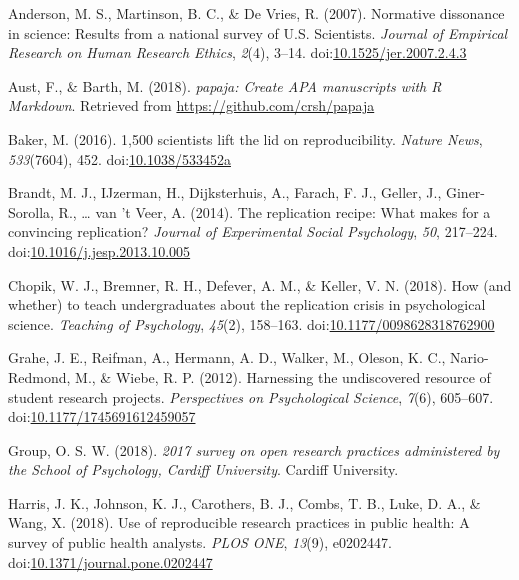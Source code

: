 \documentclass[
  man,mask,floatsintext]{apa6}
\newlength{\cslhangindent}
\newenvironment{cslreferences}%
  {\setlength{\parindent}{0pt}%
  \everypar{\setlength{\hangindent}{\cslhangindent}}\ignorespaces}%
  {\par}
\begin{document}
\hypertarget{refs}{}
\begin{cslreferences}
\leavevmode\hypertarget{ref-andersonNormativeDissonanceScience2007}{}%
Anderson, M. S., Martinson, B. C., \& De Vries, R. (2007). Normative dissonance in science: Results from a national survey of U.S. Scientists. \emph{Journal of Empirical Research on Human Research Ethics}, \emph{2}(4), 3--14. doi:\href{https://doi.org/10.1525/jer.2007.2.4.3}{10.1525/jer.2007.2.4.3}

\leavevmode\hypertarget{ref-R-papaja}{}%
Aust, F., \& Barth, M. (2018). \emph{papaja: Create APA manuscripts with R Markdown}. Retrieved from \url{https://github.com/crsh/papaja}

\leavevmode\hypertarget{ref-baker500ScientistsLift2016}{}%
Baker, M. (2016). 1,500 scientists lift the lid on reproducibility. \emph{Nature News}, \emph{533}(7604), 452. doi:\href{https://doi.org/10.1038/533452a}{10.1038/533452a}

\leavevmode\hypertarget{ref-brandtReplicationRecipeWhat2014}{}%
Brandt, M. J., IJzerman, H., Dijksterhuis, A., Farach, F. J., Geller, J., Giner-Sorolla, R., \ldots{} van 't Veer, A. (2014). The replication recipe: What makes for a convincing replication? \emph{Journal of Experimental Social Psychology}, \emph{50}, 217--224. doi:\href{https://doi.org/10.1016/j.jesp.2013.10.005}{10.1016/j.jesp.2013.10.005}

\leavevmode\hypertarget{ref-chopikHowWhetherTeach2018}{}%
Chopik, W. J., Bremner, R. H., Defever, A. M., \& Keller, V. N. (2018). How (and whether) to teach undergraduates about the replication crisis in psychological science. \emph{Teaching of Psychology}, \emph{45}(2), 158--163. doi:\href{https://doi.org/10.1177/0098628318762900}{10.1177/0098628318762900}

\leavevmode\hypertarget{ref-graheHarnessingUndiscoveredResource2012}{}%
Grahe, J. E., Reifman, A., Hermann, A. D., Walker, M., Oleson, K. C., Nario-Redmond, M., \& Wiebe, R. P. (2012). Harnessing the undiscovered resource of student research projects. \emph{Perspectives on Psychological Science}, \emph{7}(6), 605--607. doi:\href{https://doi.org/10.1177/1745691612459057}{10.1177/1745691612459057}

\leavevmode\hypertarget{ref-openscienceworkinggroup2017SurveyOpen2018}{}%
Group, O. S. W. (2018). \emph{2017 survey on open research practices administered by the School of Psychology, Cardiff University}. Cardiff University.

\leavevmode\hypertarget{ref-harrisUseReproducibleResearch2018}{}%
Harris, J. K., Johnson, K. J., Carothers, B. J., Combs, T. B., Luke, D. A., \& Wang, X. (2018). Use of reproducible research practices in public health: A survey of public health analysts. \emph{PLOS ONE}, \emph{13}(9), e0202447. doi:\href{https://doi.org/10.1371/journal.pone.0202447}{10.1371/journal.pone.0202447}


\end{cslreferences}
\end{document}
